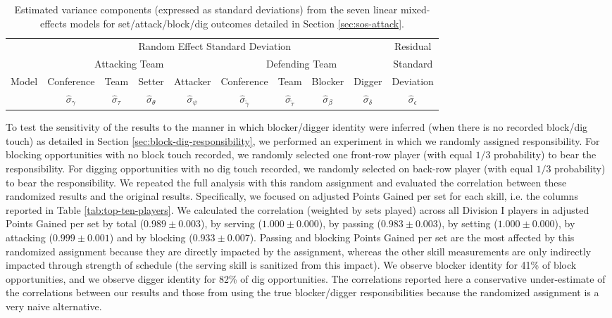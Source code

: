 \documentclass[USenglish]{article}
\theoremstyle{dgthm}
\theoremstyle{dgdef}
\begin{document}
\begin{table}
  \centering
  \begin{tabular}{l|cccc|cccc|c}
    & \multicolumn{8}{c}{Random Effect Standard Deviation} & Residual\\
    & \multicolumn{4}{c}{Attacking Team} & \multicolumn{4}{c}{Defending Team} & Standard\\
    Model & Conference & Team & Setter & Attacker & Conference & Team & Blocker & Digger & Deviation\\
    & $\hat\sigma_\gamma$ & $\hat\sigma_\tau$ & $\hat\sigma_\theta$ & $\hat\sigma_\psi$ & $\hat\sigma_{\tilde\gamma}$ & $\hat\sigma_{\tilde\tau}$ & $\hat\sigma_\beta$ & $\hat\sigma_\delta$ & $\hat\sigma_\epsilon$\\
    \hline
    
  \end{tabular}
  \caption{
    Estimated variance components (expressed as standard deviations) from the seven linear mixed-effects models for set/attack/block/dig outcomes detailed in Section \ref{sec:sos-attack}.
  }
  \label{tab:model-summary-attack}
\end{table}

To test the sensitivity of the results to the manner in which blocker/digger identity were inferred (when there is no recorded block/dig touch) as detailed in Section \ref{sec:block-dig-responsibility}, we performed an experiment in which we randomly assigned responsibility. For blocking opportunities with no block touch recorded, we randomly selected one front-row player (with equal $1/3$ probability) to bear the responsibility. For digging opportunities with no dig touch recorded, we randomly selected on back-row player (with equal $1/3$ probability) to bear the responsibility. We repeated the full analysis with this random assignment and evaluated the correlation between these randomized results and the original results. Specifically, we focused on adjusted Points Gained per set for each skill, i.e. the columns reported in Table \ref{tab:top-ten-players}. We calculated the correlation (weighted by sets played) across all Division I players in adjusted Points Gained per set by total ($0.989 \pm 0.003$), by serving ($1.000 \pm 0.000$), by passing ($0.983 \pm 0.003$), by setting ($1.000 \pm 0.000$), by attacking ($0.999 \pm 0.001$) and by blocking ($0.933 \pm 0.007$). Passing and blocking Points Gained per set are the most affected by this randomized assignment because they are directly impacted by the assignment, whereas the other skill measurements are only indirectly impacted through strength of schedule (the serving skill is sanitized from this impact). We observe blocker identity for 41\% of block opportunities, and we observe digger identity for 82\% of dig opportunities. The correlations reported here a conservative under-estimate of the correlations between our results and those from using the true blocker/digger responsibilities because the randomized assignment is a very naive alternative.
\end{document}
